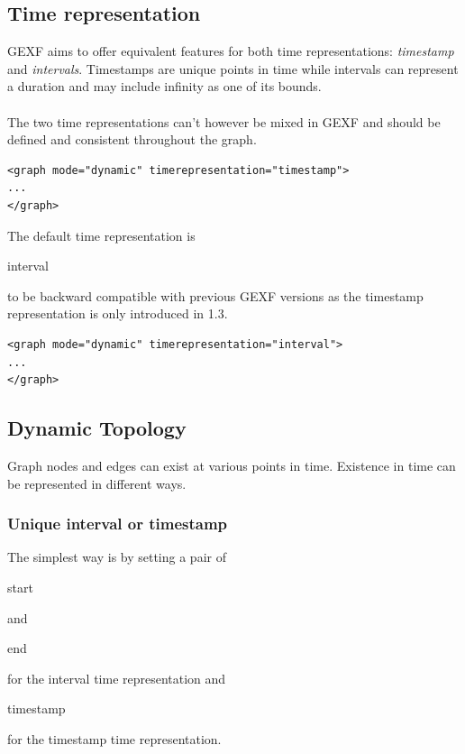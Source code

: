\documentclass[a4paper,10pt]{article}
\begin{document}
\subsection{Time representation}

GEXF aims to offer equivalent features for both time representations: \textit{timestamp} and \textit{intervals}. Timestamps are unique points in time while intervals can represent a duration and may include infinity as one of its bounds.

\paragraph{}
The two time representations can't however be mixed in GEXF and should be defined and consistent throughout the graph.

\lstset{ style=gexf }
\begin{lstlisting}[caption={Timestamp Time Representation}]
<graph mode="dynamic" timerepresentation="timestamp">
...
</graph>
\end{lstlisting}

The default time representation is \begin{footnotesize}interval\end{footnotesize} to be backward compatible with previous GEXF versions as the timestamp representation is only introduced in 1.3.

\lstset{ style=gexf }
\begin{lstlisting}[caption={Interval Time Representation}]
<graph mode="dynamic" timerepresentation="interval">
...
</graph>
\end{lstlisting}

\subsection{Dynamic Topology}

Graph nodes and edges can exist at various points in time. Existence in time can be represented in different ways.

\subsubsection{Unique interval or timestamp}

The simplest way is by setting a pair of \begin{footnotesize}start\end{footnotesize} and \begin{footnotesize}end\end{footnotesize} for the interval time representation and \begin{footnotesize}timestamp\end{footnotesize} for the timestamp time representation.
\end{document}
